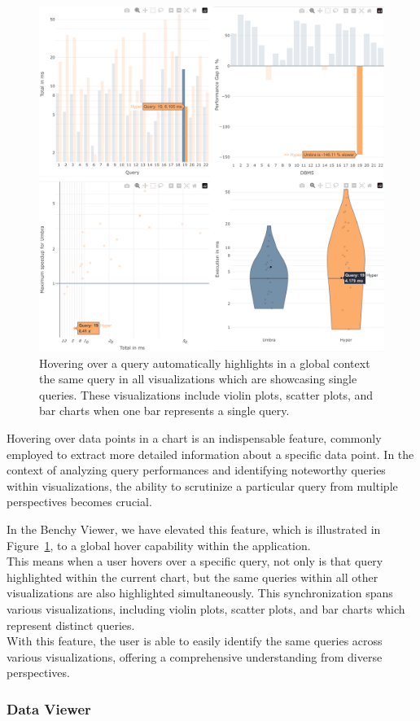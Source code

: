 \begin{figure}[h]
  \centering
  \includegraphics[width=0.6\linewidth]{figures/hover-group.png}
  \caption{Hovering over a query automatically highlights in a global context the same query in all visualizations which are showcasing single queries. These visualizations include violin plots, scatter plots, and bar charts when one bar represents a single query.}
  \label{fig:hover-group}
\end{figure}

Hovering over data points in a chart is an indispensable feature, commonly employed to extract more detailed information about a specific data point. In the context of analyzing query performances and identifying noteworthy queries within visualizations, the ability to scrutinize a particular query from multiple perspectives becomes crucial.


 In the Benchy Viewer, we have elevated this feature, which is illustrated in Figure~\ref{fig:hover-group}, to a global hover capability within the application.\\
 This means when a user hovers over a specific query, not only is that query highlighted within the current chart, but the same queries within all other visualizations are also highlighted simultaneously. This synchronization spans various visualizations, including violin plots, scatter plots, and bar charts which represent distinct queries.\\
 With this feature, the user is able to easily identify the same queries across various visualizations, offering a comprehensive understanding from diverse perspectives.



\subsubsection{Data Viewer}

